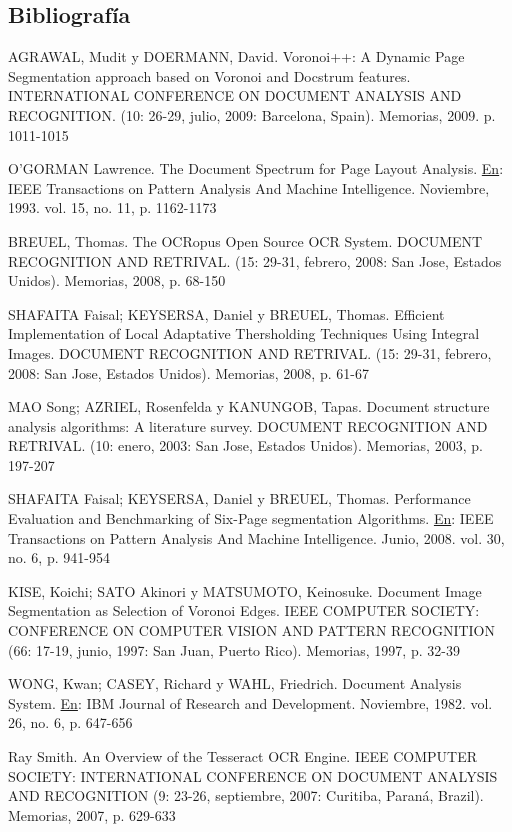 \documentclass[a4paper, 12pt, oneside]{article}
\begin{document}
	\clearpage
	\begin{center}
	\section{Bibliografía}
	\end{center}
	AGRAWAL, Mudit y DOERMANN, David. Voronoi++: A Dynamic Page Segmentation approach based on Voronoi and Docstrum features. INTERNATIONAL CONFERENCE ON DOCUMENT ANALYSIS AND RECOGNITION. (10: 26-29, julio, 2009: Barcelona, Spain). Memorias, 2009. p. 1011-1015
	
	O'GORMAN Lawrence. The Document Spectrum for Page Layout Analysis. \underline{En}: IEEE Transactions on Pattern Analysis And Machine Intelligence. Noviembre, 1993. vol. 15, no. 11, p. 1162-1173
	
	BREUEL, Thomas. The OCRopus Open Source OCR System. DOCUMENT RECOGNITION AND RETRIVAL. (15: 29-31, febrero, 2008: San Jose, Estados Unidos). Memorias, 2008, p. 68-150
	
	SHAFAITA Faisal; KEYSERSA, Daniel y BREUEL, Thomas. Efficient Implementation of Local Adaptative Thersholding Techniques Using Integral Images. DOCUMENT RECOGNITION AND RETRIVAL. (15: 29-31, febrero, 2008: San Jose, Estados Unidos). Memorias, 2008, p. 61-67
	
	MAO Song; AZRIEL, Rosenfelda y KANUNGOB, Tapas. Document structure analysis algorithms: A literature survey. DOCUMENT RECOGNITION AND RETRIVAL. (10: enero, 2003: San Jose, Estados Unidos). Memorias, 2003, p. 197-207
	
	SHAFAITA Faisal; KEYSERSA, Daniel y BREUEL, Thomas. Performance Evaluation and Benchmarking of Six-Page segmentation Algorithms. \underline{En}: IEEE Transactions on Pattern Analysis And Machine Intelligence. Junio, 2008. vol. 30, no. 6, p. 941-954
	
	KISE, Koichi; SATO Akinori y MATSUMOTO, Keinosuke. Document Image Segmentation as Selection of Voronoi Edges. IEEE COMPUTER SOCIETY: CONFERENCE ON COMPUTER VISION AND PATTERN RECOGNITION (66: 17-19, junio, 1997: San Juan, Puerto Rico). Memorias, 1997, p. 32-39
	
	WONG, Kwan; CASEY, Richard y WAHL, Friedrich. Document Analysis System. \underline{En}: IBM Journal of Research and Development. Noviembre, 1982. vol. 26, no. 6, p. 647-656
	
	Ray Smith. An Overview of the Tesseract OCR Engine. IEEE COMPUTER SOCIETY: INTERNATIONAL CONFERENCE ON DOCUMENT ANALYSIS AND RECOGNITION (9: 23-26, septiembre, 2007: Curitiba, Paraná, Brazil). Memorias, 2007, p. 629-633
	
\end{document}
